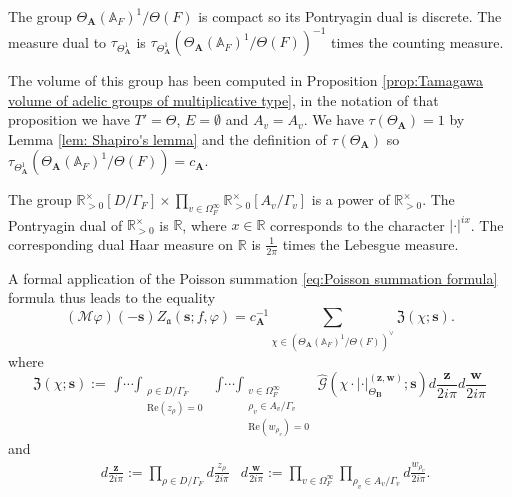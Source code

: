 \documentclass[a4paper,11pt,reqno]{amsart}
\newcommand{\R}{\mathbb{R}}
\newcommand{\A}{\mathbb{A}}
\renewcommand{\Re}{\mathrm{Re}}
\theoremstyle{definition}
\begin{document}
The group $\Theta_{\mathbf{A}}(\A_F)^1 /\Theta(F)$ is compact so its Pontryagin dual is discrete. The measure dual to $\tau_{\Theta_{\mathbf{A}}^1}$ is $\tau_{\Theta_{\mathbf{A}}^1}(\Theta_{\mathbf{A}}(\A_F)^1 /\Theta(F))^{-1}$ times the counting measure.

The volume of this group has been computed in Proposition \ref{prop:Tamagawa volume of adelic groups of multiplicative type}, in the notation of that proposition we have $T' = \Theta$, $E = \emptyset$ and $A_v = A_v$. We have $\tau(\Theta_{\mathbf{A}}) = 1$ by Lemma \ref{lem: Shapiro's lemma} and the definition of $\tau(\Theta_{\mathbf{A}})$ so $\tau_{\Theta_{\mathbf{A}}^1}(\Theta_{\mathbf{A}}(\A_F)^1/\Theta(F)) = c_{\mathbf{A}}$.

The group $\R_{> 0}^{\times}[D/ \Gamma_F] \times \prod_{v \in \Omega_{F}^{\infty}} \R_{> 0}^{\times}[A_v /\Gamma_v]$ is a power of $\R^{\times}_{> 0}$. The Pontryagin dual of $\R^{\times}_{> 0}$ is $\R$, where $x \in \R$ corresponds to the character $|\cdot|^{ix}$. The corresponding dual Haar measure on $\R$ is $\frac{1}{2 \pi}$ times the Lebesgue measure.

A formal application of the Poisson summation \eqref{eq:Poisson summation formula} formula thus leads to the equality
\begin{equation} 
	(\mathcal{M} \varphi)(-\bm{s}) Z_{\mathfrak{a}}(\bm{s}; f, \varphi) = c_{\mathbf{A}}^{-1} \sum_{\chi \in (\Theta_{\mathbf{A}}(\A_F)^1/\Theta(F))^{\vee}} \mathfrak{Z}(\chi ; \bm{s}).
	\label{Application of Poisson summation}
\end{equation}
where
\begin{equation}
	\mathfrak{Z}(\chi ; \bm{s}) := \mathop{\int \cdots \int}_{\substack{\rho \in D / \Gamma_F \\ \Re(z_{\rho}) = 0}} \mathop{\int \cdots \int}_{\substack{v \in \Omega_F^{\infty} \\ \rho_v \in A_v / \Gamma_v \\ \Re(w_{\rho_v}) = 0}} \hat{\mathcal{G}}(\chi \cdot | \cdot|_{\Theta_{\mathbf{B}}}^{(\bm{z}, \bm{w})}; \bm{s}) d\frac{\bm{z}}{2 i \pi} d \frac{\bm{w}}{2 i \pi}
	\label{Definition of Fraktur Z}
\end{equation}
and
\begin{align*}
	&d\frac{\bm{z}}{2 i \pi} := \prod_{\rho \in D / \Gamma_F} d \frac{z_{\rho}}{2 i \pi} & d\frac{\bm{w}}{2 i \pi} := \prod_{v \in \Omega_F^{\infty}} \prod_{\rho_v \in A_v / \Gamma_v} d\frac{w_{\rho_v}}{2 i \pi}. 
\end{align*} 
\end{document}
